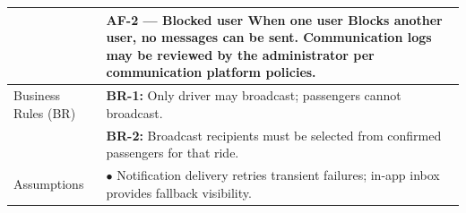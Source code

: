 \begin{longtable}{|>{\raggedright\arraybackslash}p{4cm}|>{\raggedright\arraybackslash}p{11cm}|}
& \textbf{AF-2 — Blocked user} \newline When one user Blocks another user, no messages can be sent. Communication logs may be reviewed by the administrator per communication platform policies. \\
\hline
Business Rules (BR) & \textbf{BR-1:} Only driver may broadcast; passengers cannot broadcast. \\
& \textbf{BR-2:} Broadcast recipients must be selected from confirmed passengers for that ride. \\
\hline
Assumptions & $\bullet$ Notification delivery retries transient failures; in-app inbox provides fallback visibility. \\
\end{longtable}

